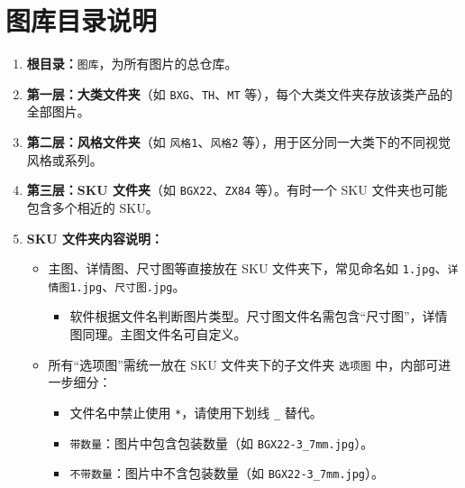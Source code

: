 \documentclass[UTF8]{ctexart}
\begin{document}
	\section*{图库目录说明}
	\begin{enumerate}
		\item \textbf{根目录：}\verb|图库|，为所有图片的总仓库。

		\item \textbf{第一层：大类文件夹}（如 \verb|BXG|、\verb|TH|、\verb|MT| 等），每个大类文件夹存放该类产品的全部图片。

		\item \textbf{第二层：风格文件夹}（如 \verb|风格1|、\verb|风格2| 等），用于区分同一大类下的不同视觉风格或系列。

		\item \textbf{第三层：SKU 文件夹}（如 \verb|BGX22|、\verb|ZX84| 等）。有时一个
			SKU 文件夹也可能包含多个相近的 SKU。

		\item \textbf{SKU 文件夹内容说明：}
			\begin{itemize}
				\item 主图、详情图、尺寸图等直接放在 SKU 文件夹下，常见命名如 \verb|1.jpg|、\verb|详情图1.jpg|、\verb|尺寸图.jpg|。
					\begin{itemize}
						\item 软件根据文件名判断图片类型。尺寸图文件名需包含“尺寸图”，详情图同理。主图文件名可自定义。
					\end{itemize}

				\item 所有“选项图”需统一放在 SKU 文件夹下的子文件夹 \verb|选项图| 中，内部可进一步细分：
					\begin{itemize}
						\item 文件名中禁止使用 \verb|*|，请使用下划线 \verb|_| 替代。

						\item \verb|带数量|：图片中包含包装数量（如
							\verb|BGX22-3_7mm.jpg|）。

						\item \verb|不带数量|：图片中不含包装数量（如
							\verb|BGX22-3_7mm.jpg|）。
					\end{itemize}
			\end{itemize}
	\end{enumerate}

\end{document}
